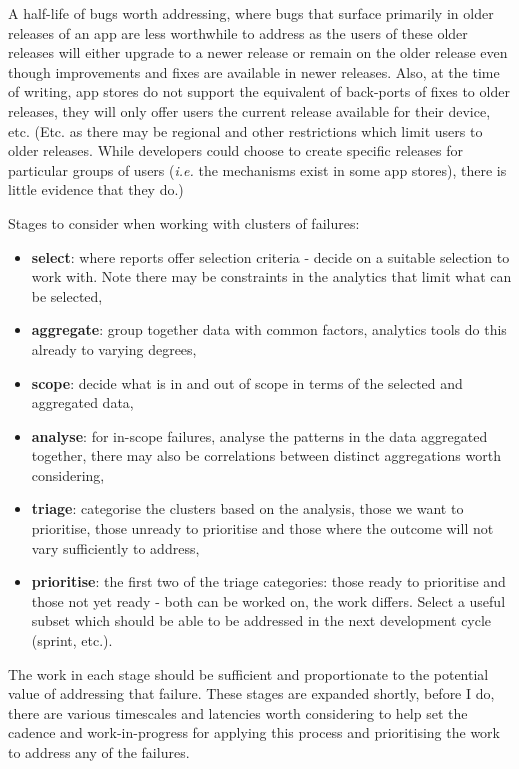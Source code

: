 A half-life of bugs worth addressing, where bugs that surface primarily in older releases of an app are less worthwhile to address as the users of these older releases will either upgrade to a newer release or remain on the older release even though improvements and fixes are available in newer releases. Also, at the time of writing, app stores do not support the equivalent of back-ports of fixes to older releases, they will only offer users the current release available for their device, etc. (Etc. as there may be regional and other restrictions which limit users to older releases. While developers could choose to create specific releases for particular groups of users (\emph{i.e.} the mechanisms exist in some app stores), there is little evidence that they do.)

Stages to consider when working with clusters of failures: 

\begin{itemize}
    \item \textbf{select}: where reports offer selection criteria - decide on a suitable selection to work with. Note there may be constraints in the analytics that limit what can be selected,
    \item \textbf{aggregate}: group together data with common factors, analytics tools do this already to varying degrees,
    \item \textbf{scope}: decide what is in and out of scope in terms of the selected and aggregated data, 
    \item \textbf{analyse}: for in-scope failures, analyse the patterns in the data aggregated together, there may also be correlations between distinct aggregations worth considering, 
    \item \textbf{triage}: categorise the clusters based on the analysis, those we want to prioritise, those unready to prioritise and those where the outcome will not vary sufficiently to address,
    \item \textbf{prioritise}: the first two of the triage categories: those ready to prioritise and those not yet ready - both can be worked on, the work differs. Select a useful subset which should be able to be addressed in the next development cycle (sprint, etc.).
\end{itemize}

The work in each stage should be sufficient and proportionate to the potential value of addressing that failure. These stages are expanded shortly, before I do, there are various timescales and latencies worth considering to help set the cadence and work-in-progress for applying this process and prioritising the work to address any of the failures.

